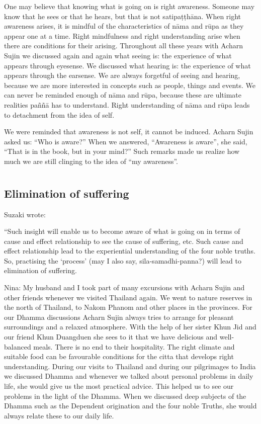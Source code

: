 One may believe that knowing what is going on is right awareness. Someone may know that he sees or that he hears, but that is not satipaṭṭhāna. When right awareness arises, it is mindful of the characteristics of nāma and rūpa as they appear one at a time. Right mindfulness and right understanding arise when there are conditions for their arising.
Throughout all these years with Acharn Sujin we discussed again and again what seeing is: the experience of what appears through eyesense. We discussed what hearing is: the experience of what appears through the earsense. We are always forgetful of seeing and hearing, because we are more interested in concepts such as people, things and events. We can never be reminded enough of nāma and rūpa, because these are ultimate realities paññā has to understand. Right understanding of nāma and rūpa leads to detachment from the idea of self.

We were reminded that awareness is not self, it cannot be induced. Acharn Sujin asked us: ``Who is aware?” When we answered, ``Awareness is aware'', she said, ``That is in the book, but in your mind?'' Such remarks made us realize how much we are still clinging to the idea of ``my awareness''.



\chapter[Elimination of Suffering]{}
\section*{Elimination of suffering}

Suzaki wrote: 

``Such insight will enable us to become aware of what is going on in terms of cause and effect relationship to see the cause of suffering, etc. Such cause and effect relationship lead to the experiential understanding of the four noble truths. So, practising the `process' (may I also say, sila-samadhi-panna?) will lead to elimination of suffering.

Nina: My husband and I took part of many excursions with Acharn Sujin and other friends whenever we visited Thailand again. We went to nature reserves in the north of Thailand, to Nakom Phanom and other places in the provinces. For our Dhamma discussions Acharn Sujin always tries to arrange for pleasant surroundings and a relaxed atmosphere. With the help of her sister Khun Jid and our friend Khun Duangduen she sees to it that we have delicious and well-balanced meals. There is no end to their hospitality. The right climate and suitable food can be favourable conditions for the citta that develops right understanding. During our visits to Thailand and during our pilgrimages to India we discussed Dhamma and whenever we talked about personal problems in daily life, she would give us the most practical advice. This helped us to see our problems in the light of the Dhamma. When we discussed deep subjects of the Dhamma such as the Dependent origination and the four noble Truths, she would always relate these to our daily life.

